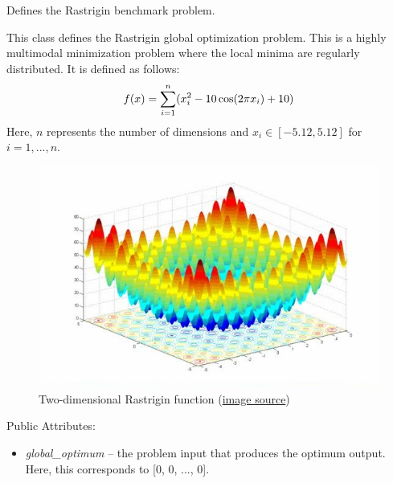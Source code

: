 \documentclass[letterpaper,10pt,english]{sphinxmanual}
\begin{document}

\begin{fulllineitems}
\label{reference:inspyred.benchmarks.Rastrigin}
Defines the Rastrigin benchmark problem.

This class defines the Rastrigin global optimization problem. This 
is a highly multimodal minimization problem where the local minima
are regularly distributed. It is defined as follows:
\begin{gather}
\begin{split}f(x) = \sum_{i=1}^n (x_i^2 - 10\cos(2\pi x_i) + 10)\end{split}\notag
\end{gather}
Here, $n$ represents the number of dimensions and $x_i \in [-5.12, 5.12]$ for $i=1,...,n$.
\begin{figure}[htbp]
\centering
\capstart

\includegraphics{image12271.jpg}
\caption{Two-dimensional Rastrigin function 
(\href{http://www-optima.amp.i.kyoto-u.ac.jp/member/student/hedar/Hedar\_files/TestGO\_files/Page2607.htm}{image source})}\end{figure}

Public Attributes:
\begin{itemize}
\item {} 
\emph{global\_optimum} -- the problem input that produces the optimum output.
Here, this corresponds to {[}0, 0, ..., 0{]}.

\end{itemize}

\end{fulllineitems}
\end{document}
